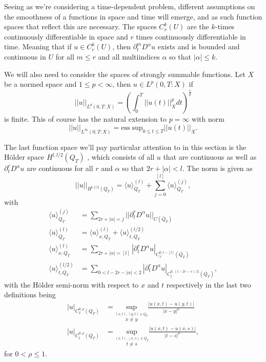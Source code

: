 \documentclass[11pt, a4paper]{article}
\begin{document}
Seeing as we're considering a time-dependent problem, different assumptions on the smoothness of a functions in space and time will emerge, and as such function spaces that reflect this are necessary. The spaces $C^k_r(U)$ are the $k$-times continuously differentiable in space and $r$ times continuously differentiable in time. Meaning that if $u \in C^k_r(U)$, then $\partial_t^m D^\alpha u$ exists and is bounded and continuous in $U$ for all $m \leq r$ and all multiindices $\alpha$ so that $|\alpha| \leq k$.

We will also need to consider the spaces of strongly summable functions. Let $X$ be a normed space and $1\leq p < \infty$, then $u \in L^p(0,T:X)$ if
\begin{equation*}
||u||_{L^p(0,T:X)} = \left( \int_0^T ||u(t)||_X^p dt \right)^\frac{1}{p}
\end{equation*} 
is finite. This of course has the natural extension to $p=\infty$ with norm
\begin{equation*}
||u||_{L^\infty(0,T:X)} = \mathrm{ess \; sup}_{0\leq t \leq T} ||u(t)||_X.
\end{equation*}

The last function space we'll pay particular attention to in this section is the Hölder space $H^{l, l/2}(Q_T)$ \citep{ladyzhenskaya}, which consists of all $u$ that are continuous as well as $\partial_t^rD^\alpha u$ are continuous for all $r$ and $\alpha$ so that $2r + |\alpha| <l$. The norm is given as
\begin{equation*}
	||u||_{H^{l,l/2}(Q_T)} = \langle u \rangle^{(l)}_{Q_T} + \sum_{j=0}^{[l]}\langle u \rangle^{(j)}_{Q_T},
\end{equation*}
with
\begin{align*}
\langle u \rangle^{(j)}_{Q_T} &= \sum_{2r+|\alpha|=j} ||\partial_t^r D^\alpha u||_{C(\bar{Q}_T)} \\
\langle u \rangle^{(l)}_{Q_T} &= \langle u \rangle^{(l)}_{x,Q_T} + \langle u \rangle^{(l/2)}_{t,Q_T} \\
\langle u \rangle^{(l)}_{x,Q_T} &= \sum_{2r+|\alpha|=[l]} |\partial_t^r D^{\alpha}u|_{C^{0,l-[l]}_x(\bar{Q}_T)} \\
 \langle u \rangle^{(l/2)}_{t,Q_T} &= \sum_{0 < l - 2r -|\alpha| < 2} |\partial_t^r D^\alpha u|_{C^{0,(l-2r-s)/2}_t(\bar{Q}_T)},
\end{align*}
with the Hölder semi-norm with respect to $x$ and $t$ respectively in the last two definitions being 
\begin{align*}
|u|_{C_x^{0,\rho}(Q_T)} &= \underset{\overset{(x,t),(y,t)\in Q_T}{x\neq y}}{\mathrm{sup}} \frac{|u(x,t) - u(y,t)|}{|x-y|^\rho} \\
|u|_{C_t^{0,\rho}(Q_T)} &= \underset{\overset{(x,t),(x,s)\in Q_T}{t\neq s}}{\mathrm{sup}}\frac{|u(x,t) - u(x,s)|}{|t-s|^\rho},
\end{align*}
for $0 < \rho \leq 1$.
\end{document}
